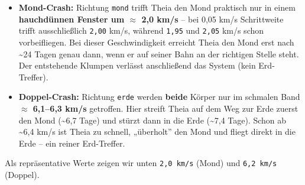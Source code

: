 \documentclass[11pt]{article}
\providecommand{\tightlist}{%
      \setlength{\itemsep}{0pt}\setlength{\parskip}{0pt}}
\begin{document}
\begin{itemize}
\tightlist
\item
  \textbf{Mond-Crash:} Richtung \texttt{mond} trifft Theia den Mond
  praktisch nur in einem \textbf{hauchdünnen Fenster um $\approx$ 2,0 km/s} --
  bei 0,05 km/s Schrittweite trifft ausschließlich \texttt{2,00} km/s,
  während \texttt{1,95} und \texttt{2,05} km/s schon vorbeifliegen. Bei
  dieser Geschwindigkeit erreicht Theia den Mond erst nach
  \textasciitilde24 Tagen genau dann, wenn er auf seiner Bahn an der
  richtigen Stelle steht. Der entstehende Klumpen verlässt anschließend
  das System (kein Erd-Treffer).
\item
  \textbf{Doppel-Crash:} Richtung \texttt{erde} werden \textbf{beide}
  Körper nur im schmalen Band \textbf{$\approx$ 6,1--6,3 km/s} getroffen. Hier
  streift Theia auf dem Weg zur Erde zuerst den Mond (\textasciitilde6,7
  Tage) und stürzt dann in die Erde (\textasciitilde7,4 Tage). Schon ab
  \textasciitilde6,4 km/s ist Theia zu schnell, „überholt'' den Mond und
  fliegt direkt in die Erde -- ein reiner Erd-Treffer.
\end{itemize}

Als repräsentative Werte zeigen wir unten \texttt{2,0\ km/s} (Mond) und
\texttt{6,2\ km/s} (Doppel).
\end{document}
